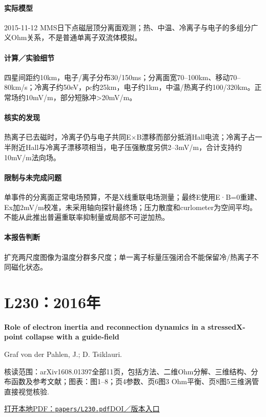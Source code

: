 \paragraph{实际模型}2015-11-12 MMS日下点磁层顶分离面观测；热、中温、冷离子与电子的多组分广义Ohm关系，不是普通单离子双流体模拟。

\paragraph{计算／实验细节}四星间距约10km，电子/离子分布30/150ms；分离面宽70–100km、移动70–80km/s；冷离子约50eV，ρc约25km，电子约1km，中温/热离子约100/320km。正常场约10mV/m，部分短脉冲>20mV/m。

\paragraph{核实的发现}热离子已去磁时，冷离子仍与电子共同E×B漂移而部分抵消Hall电流；冷离子占一半附近Hall与冷离子漂移项相当，电子压强散度另供2–3mV/m，合计支持约10mV/m法向场。

\paragraph{限制与未完成问题}单事件的分离面正常电场预算，不是X线重联电场测量；最终E使用E·B=0重建、Ex加2mV/m校准，未采用轴向探针最终场；压力散度和curlometer为空间平均。不能从此推出普遍重联率抑制量或局部不可逆加热。

\paragraph{本报告判断}扩充两尺度图像为温度分群多尺度；单一离子标量压强闭合不能保留冷/热离子不同磁化状态。

\section{L230：2016年}\label{paper:L230}

\textbf{Role of electron inertia and reconnection dynamics in a stressedX-point collapse with a guide-field}\citep{L230}\

Graf von der Pahlen,  J.;  D. Tsiklauri.

\textsf{核读范围：}arXiv1608.01397全部11页，包括方法、二维Ohm分解、三维结构、分布函数及参考文献；\textsf{图表：}图1–8；页4参数、页6图3 Ohm平衡、页8图5三维涡管直接视觉核验.

\href{run:papers/L230.pdf}{打开本地PDF：\texttt{papers/L230.pdf}}\quad\href{https://doi.org/10.1051/0004-6361/201628071}{DOI／版本入口}

